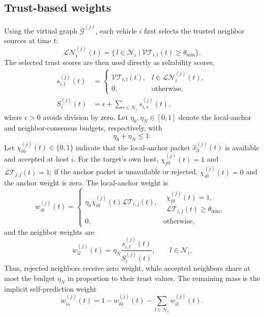 \documentclass[letterpaper,journal]{IEEEtran}
\def\G{\mathcal{G}} %
\def\N{\mathcal{N}} %
\def\LT{\mathcal{LT}} %
\def\VT{\mathcal{VT}} %
\begin{document}
\subsection{Trust-based weights}
Using the virtual graph $\bar{\G}^{(j)}$, each vehicle $i$ first selects the trusted neighbor sources at time $t$:
\begin{equation}
\mathcal{LN}^{(j)}_{i}(t)
= \Big\{\, l \in \N_i \;\big|\; \VT_{i,l}(t) \ge \theta_{\min} \Big\}.
\end{equation}
The selected trust scores are then used directly as reliability scores,
\begin{align}
s_{i,l}^{(j)}(t)
&=
\begin{cases}
\VT_{i,l}(t), & l\in\mathcal{LN}^{(j)}_{i}(t),\\
0, & \text{otherwise},
\end{cases}
\label{new_setneibor}\\
S_i^{(j)}(t)
&=\epsilon+\sum_{r\in\N_i}s_{i,r}^{(j)}(t),
\end{align}
where $\epsilon>0$ avoids division by zero. Let $\eta_0,\eta_N\in[0,1]$ denote the local-anchor and neighbor-consensus budgets, respectively, with
\begin{equation}
    \eta_0+\eta_N\le1 .
\end{equation}
Let $\chi_{i0}^{(j)}(t)\in\{0,1\}$ indicate that the local-anchor packet $\hat{x}_0^{(j)}(t)$ is available and accepted at host $i$. For the target's own host, $\chi_{j0}^{(j)}(t)=1$ and $\LT_{j,j}(t)=1$; if the anchor packet is unavailable or rejected, $\chi_{i0}^{(j)}(t)=0$ and the anchor weight is zero. The local-anchor weight is
\begin{equation}\label{eq_anchor_weight}
w_{i0}^{(j)}(t)=
\begin{cases}
\eta_0\chi_{i0}^{(j)}(t)\LT_{i,j}(t), &
\substack{\chi_{i0}^{(j)}(t)=1,\\ \LT_{i,j}(t)\ge\theta_{\min},}\\
0, & \text{otherwise},
\end{cases}
\end{equation}
and the neighbor weights are
\begin{equation}\label{design_gain}
    w_{il}^{(j)}(t)
    =
    \eta_N
    \frac{s_{i,l}^{(j)}(t)}
    {S_i^{(j)}(t)},
    \qquad l\in\N_i .
\end{equation}
Thus, rejected neighbors receive zero weight, while accepted neighbors share at most the budget $\eta_N$ in proportion to their trust values. The remaining mass is the implicit self-prediction weight
\begin{equation}
    w_{is}^{(j)}(t)
    =
    1-w_{i0}^{(j)}(t)-\sum_{l\in\N_i}w_{il}^{(j)}(t).
\end{equation}
\end{document}
